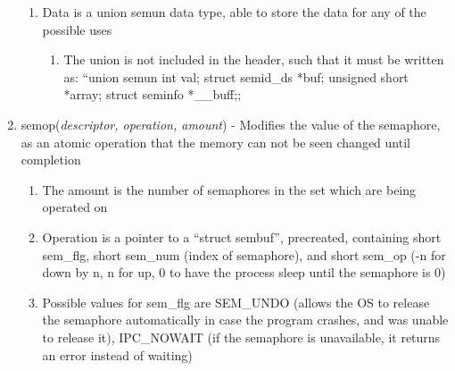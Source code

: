 \documentclass[11 pt, twoside]{article}
\begin{document}
\begin{enumerate}
\begin{enumerate}
\item Data is a union semun data type, able to store the data for any of the possible uses
\begin{enumerate}
\item The union is not included in the header, such that it must be written as: ``union semun {int val; struct semid\_ds *buf; unsigned short *array; struct seminfo *\_\_buff;};
\end{enumerate}
\end{enumerate}
\item semop(\textit{descriptor, operation, amount}) - Modifies the value of the semaphore, as an atomic operation that the memory can not be seen changed until completion 
\begin{enumerate}
\item The amount is the number of semaphores in the set which are being operated on
\item Operation is a pointer to a ``struct sembuf'', precreated, containing short sem\_flg, short sem\_num (index of semaphore), and short sem\_op (-n for down by n, n for up, 0 to have the process sleep until the semaphore is 0)
\item Possible values for sem\_flg are SEM\_UNDO (allows the OS to release the semaphore automatically in case the program crashes, and was unable to release it), IPC\_NOWAIT (if the semaphore is unavailable, it returns an error instead of waiting)
\end{enumerate}
\end{enumerate}
\end{document}
